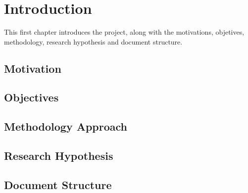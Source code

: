 \chapter{Introduction} \label{introduction}

This first chapter introduces the project, along with the motivations, objetives, methodology, research hypothesis and document structure.

\section{Motivation}


\section{Objectives}


\section{Methodology Approach}


\section{Research Hypothesis}


\section{Document Structure}
